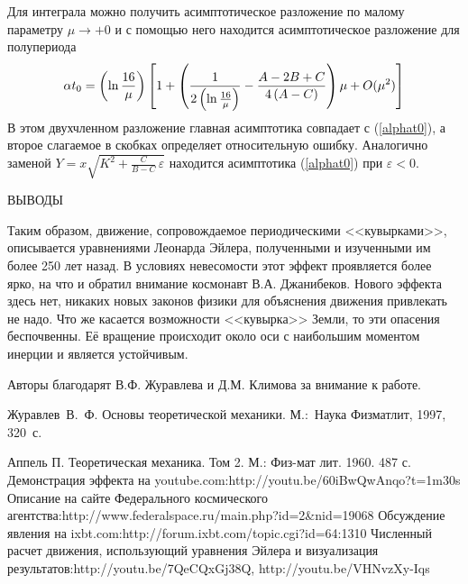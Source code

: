 \documentclass[14pt,a4paper]{extarticle}
\def\eps{\varepsilon}
\begin{document}
Для интеграла можно получить асимптотическое разложение по малому параметру $\mu\rightarrow +0$
и с помощью него находится асимптотическое разложение для полупериода 
$$\alpha t_{0}=
\left( \ln \frac{16}{\mu }\right) \left[ 1+\left( \frac{1}{2\left( \ln \frac{%
16}{\mu }\right) }-\frac{A-2B+C}{4\left( A-C\right) }\right) \mu +O(\mu ^{2})%
\right] $$
В этом двухчленном разложение главная асимптотика совпадает с (\ref{alphat0}), а второе слагаемое в скобках определяет относительную ошибку.
Аналогично заменой $Y=x\sqrt{K^2+\frac{C}{B-C}\,\varepsilon}$ находится асимптотика (\ref{alphat0}) при $\eps<0$. 

{ВЫВОДЫ} 


\smallskip
Таким образом, движение, сопровождаемое периодическими <<кувырками>>, описывается уравнениями Леонарда Эйлера, полученными и изученными им более 250 лет назад. В условиях невесомости этот эффект проявляется более ярко, на что и обратил внимание космонавт В.А. Джанибеков. Нового эффекта здесь нет, никаких новых законов физики для объяснения движения привлекать не надо. Что же касается возможности <<кувырка>> Земли, то эти опасения беспочвенны. Её вращение происходит около оси с наибольшим моментом инерции и является устойчивым.    


\smallskip

Авторы благодарят В.Ф. Журавлева и Д.М. Климова за внимание к работе.

\begin{thebibliography}{99}
 Журавлев~В.~Ф. Основы теоретической механики.
М.:~Наука Физматлит, 1997, 320~с.

 Аппель П. Теоретическая механика. Том 2. М.: Физ-мат лит. 1960. 487 с.
 Демонстрация эффекта на youtube.com:\newline http://youtu.be/60iBwQwAnqo?t=1m30s
 Описание на сайте Федерального космического агентства:\newline http://www.federalspace.ru/main.php?id=2\&nid=19068
 Обсуждение явления на ixbt.com:\newline http://forum.ixbt.com/topic.cgi?id=64:1310
 Численный расчет движения, использующий уравнения Эйлера и визуализация результатов:\newline http://youtu.be/7QeCQxGj38Q, http://youtu.be/VHNvzXy-Iqs
\end{thebibliography}
\end{document}
